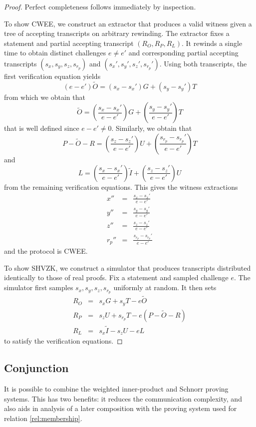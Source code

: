 \documentclass{article}
\theoremstyle{definition}
\newcommand{\wt}[1]{\widetilde{#1}}
\begin{document}
\begin{proof}
	Perfect completeness follows immediately by inspection.

	To show CWEE, we construct an extractor that produces a valid witness given a tree of accepting transcripts on arbitrary rewinding.
	The extractor fixes a statement and partial accepting transcript $(R_O, R_P, R_L)$.
	It rewinds a single time to obtain distinct challenges $e \neq e'$ and corresponding partial accepting transcripts $(s_x, s_y, s_z, s_{r_p})$ and $(s_x', s_y', s_z', s_{r_p}')$.
	Using both transcripts, the first verification equation yields
	$$(e - e') \wt{O} = (s_x - s_x') G + (s_y - s_y') T$$
	from which we obtain that
	$$\wt{O} = \left(\frac{s_x - s_x'}{e - e'}\right) G + \left(\frac{s_y - s_y'}{e - e'}\right) T$$
	that is well defined since $e - e' \neq 0$.
	Similarly, we obtain that
	$$P - \wt{O} - R = \left(\frac{s_z - s_z'}{e - e'}\right) U + \left(\frac{s_{r_p} - s_{r_p}'}{e - e'}\right) T$$
	and
	$$L = \left(\frac{s_x - s_x'}{e - e'}\right) \wt{I} + \left(\frac{s_z - s_z'}{e - e'}\right) U$$
	from the remaining verification equations.
	This gives the witness extractions
	\begin{eqnarray*}
		x'' &=& \frac{s_x - s_x'}{e - e'} \\
		y'' &=& \frac{s_y - s_y'}{e - e'} \\
		z'' &=& \frac{s_z - s_z'}{e - e'} \\
		r_p'' &=& \frac{s_{r_p} - s_{r_p}'}{e - e'}
	\end{eqnarray*}
	and the protocol is CWEE.

	To show SHVZK, we construct a simulator that produces transcripts distributed identically to those of real proofs.
	Fix a statement and sampled challenge $e$.
	The simulator first samples $s_x, s_y, s_z, s_{r_p}$ uniformly at random.
	It then sets
	\begin{eqnarray*}
		R_O &=& s_x G + s_y T - e \wt{O} \\
		R_P &=& s_z U + s_{r_p} T - e(P - \wt{O} - R) \\
		R_L &=& s_x \wt{I} - s_z U - e L
	\end{eqnarray*}
	to satisfy the verification equations.
\end{proof}


\subsection{Conjunction}

It is possible to combine the weighted inner-product and Schnorr proving systems.
This has two benefits: it reduces the communication complexity, and also aids in analysis of a later composition with the proving system used for relation \ref{rel:membership}.
\end{document}
